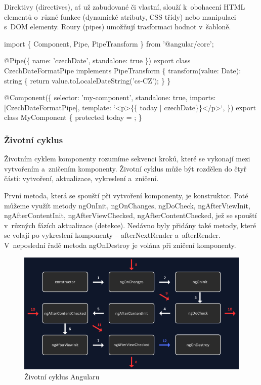 Direktivy (directives), ať už zabudované či vlastní, slouží k~obohacení HTML elementů o~různé funkce (dynamické atributy, CSS třídy) nebo manipulaci s~DOM elementy. 
Roury (pipes) umožňují trasformaci hodnot v~šabloně.\cite{angulardev,angulario}

\begin{prog}
import \{ Component, Pipe, PipeTransform \} from '@angular/core';

@Pipe(\{ name: 'czechDate', standalone: true \})
export class CzechDateFormatPipe implements PipeTransform \{
  transform(value: Date): string \{
    return value.toLocaleDateString('cs-CZ');
  \}
\}

@Component(\{
  selector: 'my-component',
  standalone: true,
  imports: [CzechDateFormatPipe],
  template: `<p>\{\{ today | czechDate\}\}</p>`,
\})
export class MyComponent \{
  protected today = ;
\}
\end{prog}

\subsubsection{Životní cyklus}

Životním cyklem komponenty rozumíme sekvenci kroků, které se vykonají mezi vytvořením a~zničením komponenty. 
Životní cyklus může být rozdělen do čtyř částí: vytvoření, aktualizace, vykreslení a~zničení. 

První metoda, která se spouští při vytvoření komponenty, je konstruktor. 
Poté můžeme využít metody ngOnInit, ngOnChanges, ngDoCheck, ngAfterViewInit, ngAfterContentInit, ngAfterViewChecked, ngAfterContentChecked, jež se spouští v~různých fázích aktualizace (detekce). 
Nedávno byly přidány také metody, které se volají po vykreslení komponenty -- afterNextRender a~afterRender. 
V~neposlední řadě metoda ngOnDestroy je volána při zničení komponenty.\cite{angulardev,learningangular}

\begin{figure}[htb]
	\centering
		\includegraphics[width=.95\textwidth]{images/angularlifecycle.png}
	\caption[Životní cyklus Angularu]{Životní cyklus Angularu \cite{angularlifecycle}}
	\label{fig:angularlifecycle}
\end{figure}

